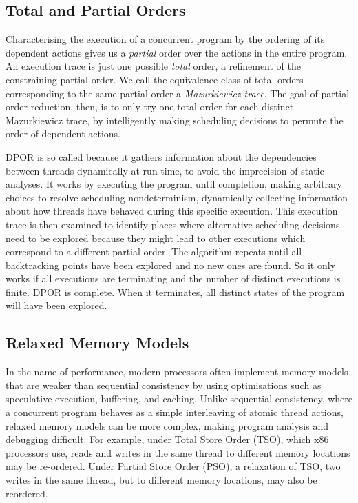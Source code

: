 \subsection{Total and Partial Orders}

Characterising the execution of a concurrent program by the ordering
of its dependent actions gives us a \emph{partial} order over the
actions in the entire program.  An execution trace is just one
possible \emph{total} order, a refinement of the constraining partial
order.  We call the equivalence class of total orders corresponding to
the same partial order a \emph{Mazurkiewicz
  trace}\cite{mazurkiewicz1986}.  The goal of partial-order reduction,
then, is to only try one total order for each distinct Mazurkiewicz
trace, by intelligently making scheduling decisions to permute the
order of dependent actions.

DPOR is so called because it gathers information about the
dependencies between threads dynamically at run-time, to avoid the
imprecision of static analyses\cite{flanagan2005}.  It works by
executing the program until completion, making arbitrary choices to
resolve scheduling nondeterminism, dynamically collecting information
about how threads have behaved during this specific execution.  This
execution trace is then examined to identify places where alternative
scheduling decisions need to be explored because they might lead to
other executions which correspond to a different partial-order.  The
algorithm repeats until all backtracking points have been explored and
no new ones are found.  So it only works if all executions are
terminating and the number of distinct executions is finite.  DPOR is
complete.  When it terminates, all distinct states of the program will
have been explored.

\subsection{Relaxed Memory Models}

In the name of performance, modern processors often implement memory
models that are weaker than sequential consistency\cite{lamport1979}
by using optimisations such as speculative execution, buffering, and
caching.  Unlike sequential consistency, where a concurrent program
behaves as a simple interleaving of atomic thread actions, relaxed
memory models can be more complex, making program analysis and
debugging difficult.  For example, under Total Store Order (TSO),
which x86 processors use\cite{owens2009}, reads and writes in the same
thread to different memory locations may be re-ordered.  Under Partial
Store Order (PSO), a relaxation of TSO\cite{sparc}, two writes in the
same thread, but to different memory locations, may also be reordered.

